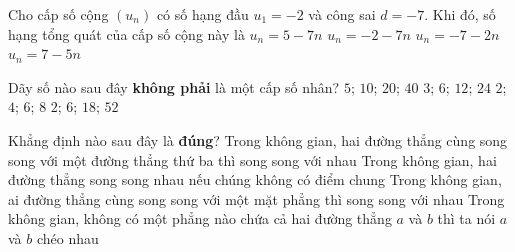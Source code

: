 \begin{ex}%
	Cho cấp số cộng $(u_n)$ có số hạng đầu $u_1=-2$ và công sai $d=-7$. Khi đó, số hạng tổng quát của cấp số cộng này là
	\choice
	{\True $u_n=5-7n$}
	{$u_n=-2-7n$}
	{$u_n=-7-2n$}
	{$u_n=7-5n$}
\end{ex}

\begin{ex}%
	Dãy số nào sau đây\textbf{ không phải} là một cấp số nhân?
	\choice
	{$5$; $10$; $20$; $40$}
	{$3$; $6$; $12$; $24$}
	{$2$; $4$; $6$; $8$}
	{\True $2$; $6$; $18$; $52$}
\end{ex}

\begin{ex}%
	Khẳng định nào sau đây là \textbf{đúng}?
	\choice
	{Trong không gian, hai đường thẳng cùng song song với một đường thẳng thứ ba thì song song với nhau}
	{Trong không gian, hai đường thẳng song song nhau nếu chúng không có điểm chung}
	{Trong không gian, ai đường thẳng cùng song song với một mặt phẳng thì song song với nhau}
	{\True Trong không gian, không có một phẳng nào chứa cả hai đường thẳng $a$ và $b$ thì ta nói $a$ và $b$ chéo nhau}
\end{ex}

